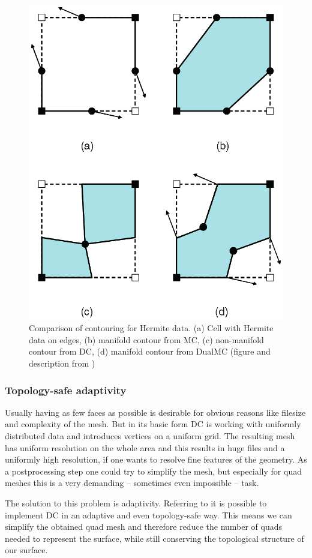 \begin{figure}
\begin{center}
\includegraphics[width=.5 \textwidth]{Pictures/SurfaceReconstruction/ManifoldDC.png}
\end{center}
\label{fig:manifold}
\caption{Comparison of contouring for Hermite data. (a) Cell with Hermite data on edges, (b) manifold contour from \acs{MC}, (c) non-manifold contour from \acs{DC}, (d) manifold contour from \acs{DualMC} (figure and description from \cite{Schaefer2007})}
\end{figure}

\subsubsection{Topology-safe adaptivity}
Usually having as few faces as possible is desirable for obvious reasons like filesize and complexity of the mesh. But in its basic form \ac{DC} is working with uniformly distributed data and introduces vertices on a uniform grid. The resulting mesh has uniform resolution on the whole area and this results in huge files and a uniformly high resolution, if one wants to resolve fine features of the geometry. As a postprocessing step one could try to simplify the mesh, but especially for \ac{quad} meshes this is a very demanding -- sometimes even impossible -- task.

The solution to this problem is adaptivity. Referring to \cite{Hermite2002} it is possible to implement \ac{DC} in an adaptive and even topology-safe way. This means we can simplify the obtained \ac{quad} mesh and therefore reduce the number of \acp{quad} needed to represent the surface, while still conserving the topological structure of our surface.